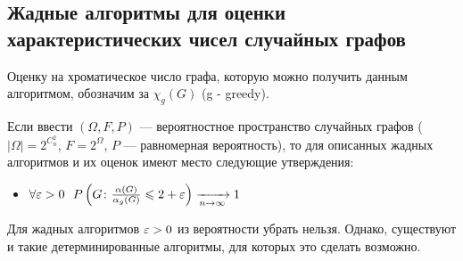\subsection{Жадные алгоритмы для оценки характеристических чисел случайных графов}

\begin{note}
	Оценку на хроматическое число графа, которую можно получить данным алгоритмом, обозначим за $\chi_g(G)$ (g - greedy).
\end{note}

\begin{theorem}
	Если ввести $(\Omega, F, P)$ --- вероятностное пространство случайных графов ($|\Omega| = 2^{C_n^2}$, $F = 2^\Omega$, $P$ --- равномерная вероятность), то для описанных жадных алгоритмов и их оценок имеют место следующие утверждения:
	\begin{itemize}
		\item \(\forall \varepsilon > 0\ \ P\left(G \colon \frac{\alpha(G)}{\alpha_g(G)} \leqslant 2 + \varepsilon\right) \xrightarrow[n \to \infty]{} 1\)
	\end{itemize}
\end{theorem}

\begin{note}
	Для жадных алгоритмов $\varepsilon > 0$ из вероятности убрать нельзя. Однако, существуют и такие детерминированные алгоритмы, для которых это сделать возможно.
\end{note}

